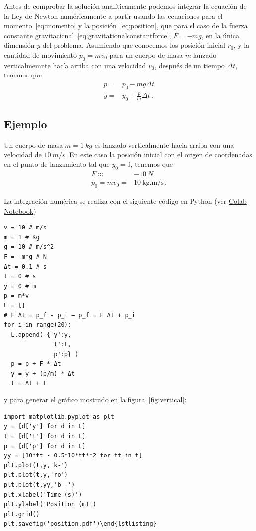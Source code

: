 \documentclass[11pt,a4paper]{book}
\begin{document}






Antes de comprobar la solución analíticamente podemos integrar la ecuación de la Ley de Newton numéricamente a partir usando las ecuaciones para el momento~\eqref{eq:momento} y la posición~\eqref{eq:position}, que para el caso de la fuerza constante gravitacional~\eqref{eq:gravitationalconstantforce}, $F=-mg$,  en la única dimensión $y$ del problema. Asumiendo que conocemos los posición inicial $r_0$, y la cantidad de movimiento $p_0 = m v_0$ para un cuerpo de masa $m$ lanzado verticalmemnte hacía arriba con una velocidad $v_0$, después de un tiempo $\Delta t$, tenemos que
\begin{align}
    p =& p_0 -{m}{g}\Delta t\\
    y =& y_0 + \frac{p}{m}\Delta t\,.
\end{align}

\subsection*{Ejemplo}
Un cuerpo de masa $m = \qty{1}{kg}$ es lanzado verticalmente hacia arriba con una velocidad de $\qty{10}{m/s}$.  En este caso la posición inicial con el origen de coordenadas en el punto de lanzamiento tal que $y_0 =0$, tenemos que 
\begin{align*}
    F \approx& -\qty{10}{N}\\
    p_0 = m v_0 =& \qty{10}{\kilo\g.\m/\s}\,.
\end{align*}

La integración numérica se realiza con el siguiente código en Python (ver \href{https://colab.research.google.com/drive/1hTbvhsqv9wrrf8e5yLNCkiJOB5xMsn5O?usp=sharing}{Colab Notebook})

\begin{verbatim}
v = 10 # m/s
m = 1 # Kg
g = 10 # m/s^2
F = -m*g # N
Δt = 0.1 # s
t = 0 # s
y = 0 # m
p = m*v
L = []
# F Δt = p_f - p_i → p_f = F Δt + p_i
for i in range(20):
  L.append( {'y':y,
             't':t,
             'p':p} )
  p = p + F * Δt 
  y = y + (p/m) * Δt 
  t = Δt + t        
\end{verbatim}

y para generar el gráfico mostrado en la figura~\ref{fig:vertical}:

\begin{verbatim}
import matplotlib.pyplot as plt
y = [d['y'] for d in L]
t = [d['t'] for d in L]
p = [d['p'] for d in L]
yy = [10*tt - 0.5*10*tt**2 for tt in t]
plt.plot(t,y,'k-')
plt.plot(t,y,'ro')
plt.plot(t,yy,'b--')
plt.xlabel('Time (s)')
plt.ylabel('Position (m)')
plt.grid()
plt.savefig('position.pdf')\end{lstlisting}
\end{verbatim}
\end{document}
